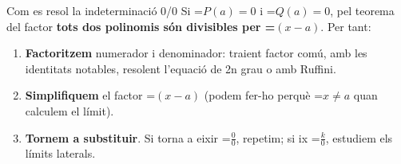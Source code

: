 \documentclass[11pt,a4paper]{article}
\newcommand{\fmm}[1]{\setbox0=\hbox{$#1$}\ifdim\wd0>\linewidth\[#1\]\else\mbox{\box0}\fi}
\begin{document}
  

  
\begin{fmdef}{Com es resol la indeterminació 0/0}
Si \fmm{P(a)=0} i \fmm{Q(a)=0}, pel teorema del factor \textbf{tots dos polinomis són divisibles per \fmm{(x-a)}}. Per tant:

      
\begin{enumerate}
\item \textbf{Factoritzem} numerador i denominador: traient factor comú, amb les identitats notables, resolent l'equació de 2n grau o amb Ruffini.
\item \textbf{Simplifiquem} el factor \fmm{(x-a)} (podem fer-ho perquè \fmm{x\neq a} quan calculem el límit).
\item \textbf{Tornem a substituir}. Si torna a eixir \fmm{\frac00}, repetim; si ix \fmm{\frac{k}{0}}, estudiem els límits laterals.
\end{enumerate}
\end{fmdef}
\end{document}
